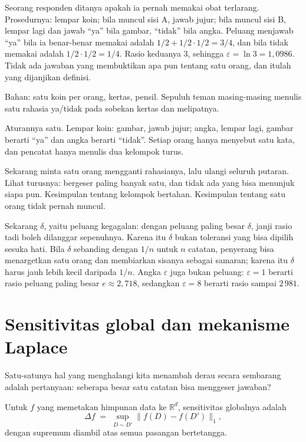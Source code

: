 \begin{contoh}
Seorang responden ditanya apakah ia pernah memakai obat terlarang. Prosedurnya: lempar
koin; bila muncul sisi A, jawab jujur; bila muncul sisi B, lempar lagi dan jawab ``ya''
bila gambar, ``tidak'' bila angka. Peluang menjawab ``ya'' bila ia benar-benar memakai
adalah $1/2+1/2\cdot 1/2=3/4$, dan bila tidak memakai adalah $1/2\cdot 1/2=1/4$.
Rasio keduanya $3$, sehingga $\varepsilon=\ln 3=1{,}0986$. Tidak ada jawaban yang
membuktikan apa pun tentang satu orang, dan itulah yang dijanjikan definisi.
\end{contoh}

\begin{tangan}
Bahan: satu koin per orang, kertas, pensil. Sepuluh teman masing-masing menulis satu
rahasia ya/tidak pada sobekan kertas dan melipatnya.

Aturannya satu. Lempar koin: gambar, jawab jujur; angka, lempar lagi, gambar berarti
``ya'' dan angka berarti ``tidak''. Setiap orang hanya menyebut satu kata, dan pencatat
hanya menulis dua kelompok turus.

Sekarang minta satu orang mengganti rahasianya, lalu ulangi seluruh putaran. Lihat
turusnya: bergeser paling banyak satu, dan tidak ada yang bisa menunjuk siapa pun.
Kesimpulan tentang kelompok bertahan. Kesimpulan tentang satu orang tidak pernah muncul.
\end{tangan}

Sekarang $\delta$, yaitu peluang kegagalan: dengan peluang paling besar $\delta$, janji
rasio tadi boleh dilanggar sepenuhnya. Karena itu $\delta$ bukan toleransi yang bisa
dipilih sesuka hati. Bila $\delta$ sebanding dengan $1/n$ untuk $n$ catatan, penyerang
bisa menargetkan satu orang dan membiarkan sisanya sebagai samaran; karena itu $\delta$
harus jauh lebih kecil daripada $1/n$. Angka $\varepsilon$ juga bukan peluang:
$\varepsilon=1$ berarti rasio peluang paling besar $e\approx 2{,}718$, sedangkan
$\varepsilon=8$ berarti rasio sampai $2\,981$.

\section{Sensitivitas global dan mekanisme Laplace}

Satu-satunya hal yang menghalangi kita menambah derau secara sembarang adalah
pertanyaan: seberapa besar satu catatan bisa menggeser jawaban?

\begin{definisi}
Untuk $f$ yang memetakan himpunan data ke $\mathbb{R}^d$, sensitivitas globalnya adalah
\begin{equation}
\Delta f \;=\; \sup_{D\sim D'} \bigl\| f(D)-f(D') \bigr\|_{1},
\end{equation}
dengan supremum diambil atas semua pasangan bertetangga.
\end{definisi}

